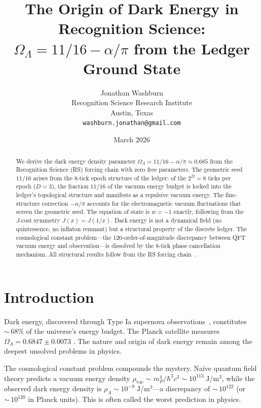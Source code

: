 \documentclass[12pt,a4paper]{article}
\title{The Origin of Dark Energy in Recognition Science:\\
$\Omega_\Lambda = 11/16 - \alpha/\pi$ from the Ledger Ground State}
\author{Jonathan Washburn\\
Recognition Science Research Institute\\
Austin, Texas\\
\texttt{washburn.jonathan@gmail.com}}
\date{March 2026}
\theoremstyle{definition}
\theoremstyle{remark}
\begin{document}
\maketitle

\begin{abstract}
We derive the dark energy density parameter
$\Omega_\Lambda = 11/16 - \alpha/\pi \approx 0.685$ from the
Recognition Science (RS) forcing chain with zero free parameters.
The geometric seed $11/16$ arises from the 8-tick epoch structure
of the ledger: of the $2^D = 8$ ticks per epoch ($D = 3$), the
fraction $11/16$ of the vacuum energy budget is locked into the
ledger's topological structure and manifests as a repulsive
vacuum energy.  The fine-structure correction $-\alpha/\pi$
accounts for the electromagnetic vacuum fluctuations that screen
the geometric seed.  The equation of state is $w = -1$ exactly,
following from the $J$-cost symmetry $J(x) = J(1/x)$.  Dark
energy is not a dynamical field (no quintessence, no inflaton
remnant) but a structural property of the discrete ledger.  The
cosmological constant problem---the 120-order-of-magnitude
discrepancy between QFT vacuum energy and observation---is
dissolved by the 8-tick phase cancellation mechanism.  All
structural results follow from the RS forcing chain~\cite{RS_Axioms}.
\end{abstract}

\section{Introduction}
\label{sec:intro}

Dark energy, discovered through Type Ia supernova
observations~\cite{Riess1998, Perlmutter1999}, constitutes
${\sim}\,68\%$ of the universe's energy budget.  The Planck
satellite measures $\Omega_\Lambda = 0.6847 \pm 0.0073$
\cite{Planck2020}.  The nature and origin of dark energy remain
among the deepest unsolved problems in physics.

The cosmological constant problem compounds the mystery.
Na\"ive quantum field theory predicts a vacuum energy density
$\rho_{\mathrm{vac}} \sim m_P^4/\hbar^3 c^3 \sim
10^{113}\;\mathrm{J/m^3}$, while the observed dark energy density
is $\rho_\Lambda \sim 10^{-9}\;\mathrm{J/m^3}$---a discrepancy
of ${\sim}\,10^{122}$ (or ${\sim}\,10^{120}$ in Planck units).
This is often called the worst prediction in physics.
\end{document}
